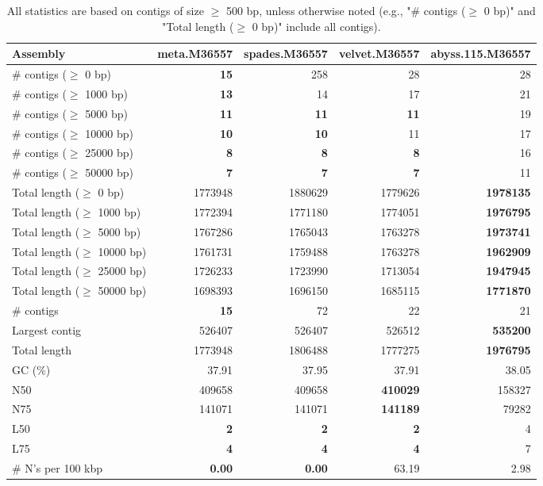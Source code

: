 \documentclass[12pt,a4paper]{article}
\begin{document}
\begin{table}[ht]
\begin{center}
\caption{All statistics are based on contigs of size $\geq$ 500 bp, unless otherwise noted (e.g., "\# contigs ($\geq$ 0 bp)" and "Total length ($\geq$ 0 bp)" include all contigs).}
\begin{tabular}{|l*{4}{|r}|}
\hline
Assembly & meta.M36557 & spades.M36557 & velvet.M36557 & abyss.115.M36557 \\ \hline
\# contigs ($\geq$ 0 bp) & {\bf 15} & 258 & 28 & 28 \\ \hline
\# contigs ($\geq$ 1000 bp) & {\bf 13} & 14 & 17 & 21 \\ \hline
\# contigs ($\geq$ 5000 bp) & {\bf 11} & {\bf 11} & {\bf 11} & 19 \\ \hline
\# contigs ($\geq$ 10000 bp) & {\bf 10} & {\bf 10} & 11 & 17 \\ \hline
\# contigs ($\geq$ 25000 bp) & {\bf 8} & {\bf 8} & {\bf 8} & 16 \\ \hline
\# contigs ($\geq$ 50000 bp) & {\bf 7} & {\bf 7} & {\bf 7} & 11 \\ \hline
Total length ($\geq$ 0 bp) & 1773948 & 1880629 & 1779626 & {\bf 1978135} \\ \hline
Total length ($\geq$ 1000 bp) & 1772394 & 1771180 & 1774051 & {\bf 1976795} \\ \hline
Total length ($\geq$ 5000 bp) & 1767286 & 1765043 & 1763278 & {\bf 1973741} \\ \hline
Total length ($\geq$ 10000 bp) & 1761731 & 1759488 & 1763278 & {\bf 1962909} \\ \hline
Total length ($\geq$ 25000 bp) & 1726233 & 1723990 & 1713054 & {\bf 1947945} \\ \hline
Total length ($\geq$ 50000 bp) & 1698393 & 1696150 & 1685115 & {\bf 1771870} \\ \hline
\# contigs & {\bf 15} & 72 & 22 & 21 \\ \hline
Largest contig & 526407 & 526407 & 526512 & {\bf 535200} \\ \hline
Total length & 1773948 & 1806488 & 1777275 & {\bf 1976795} \\ \hline
GC (\%) & 37.91 & 37.95 & 37.91 & 38.05 \\ \hline
N50 & 409658 & 409658 & {\bf 410029} & 158327 \\ \hline
N75 & 141071 & 141071 & {\bf 141189} & 79282 \\ \hline
L50 & {\bf 2} & {\bf 2} & {\bf 2} & 4 \\ \hline
L75 & {\bf 4} & {\bf 4} & {\bf 4} & 7 \\ \hline
\# N's per 100 kbp & {\bf 0.00} & {\bf 0.00} & 63.19 & 2.98 \\ \hline
\end{tabular}
\end{center}
\end{table}
\end{document}
